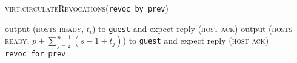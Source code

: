 \begin{center}
\begin{processbox}{\textsc{virt.circulateRevocations}(\texttt{revoc\_by\_prev})}
\begin{algorithmic}[1]
        \State output (\textsc{hosts ready}, $t_i$) to \texttt{guest} and expect
        reply (\textsc{host ack})
        \label{code:virtual-layer:revocation:hosts-ready}
      \Else \: 
        \State output (\textsc{hosts ready}, $p + \sum\limits_{j = 2}^{n-1}(s -
        1 + t_j)$) to \texttt{guest} and expect reply (\textsc{host ack})
      \EndIf
      \State \Return \texttt{revoc\_for\_prev}
    \end{algorithmic}
  \end{processbox}
  \label{code:virtual-layer:revocation}
\end{center} \ \\

